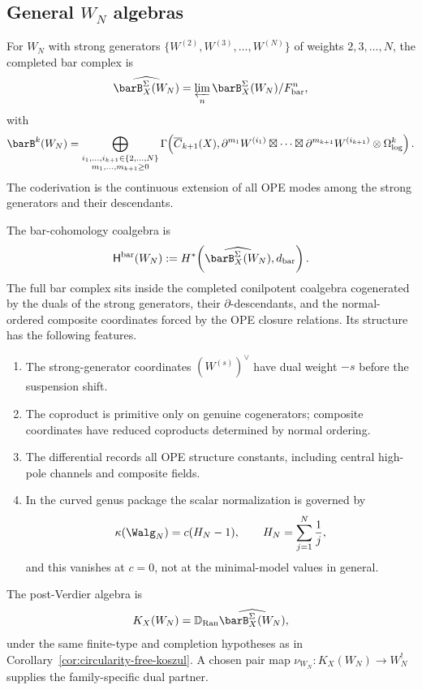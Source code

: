 
\subsection{\texorpdfstring{General $W_N$ algebras}{General W-N algebras}}

\begin{construction}
\label{const:wn-general}

For $W_N$ with strong generators
$\{W^{(2)},W^{(3)},\ldots,W^{(N)}\}$ of weights
$2,3,\ldots,N$, the completed bar complex is
\[
\widehat{\barB_X^\Sigma(W_N)}
=\varprojlim_n \barB_X^\Sigma(W_N)/F^n_{\mathrm{bar}},
\]
with
\[
\barB^k(W_N)=
\bigoplus_{\substack{i_1,\ldots,i_{k+1}\in\{2,\ldots,N\}\\
m_1,\ldots,m_{k+1}\ge0}}
\Gamma\!\left(
\overline C_{k+1}(X),
\partial^{m_1}W^{(i_1)}\boxtimes\cdots\boxtimes
\partial^{m_{k+1}}W^{(i_{k+1})}\otimes\Omega^k_{\log}
\right).
\]
The coderivation is the continuous extension of all OPE modes among the
strong generators and their descendants.

The bar-cohomology coalgebra is
\[
\mathsf H^{\mathrm{bar}}(W_N)
:=H^*\!\left(\widehat{\barB_X^\Sigma(W_N)},d_{\mathrm{bar}}\right).
\]
The full bar complex sits inside the completed conilpotent coalgebra
cogenerated by the duals of the strong generators, their
$\partial$-descendants, and the normal-ordered composite coordinates
forced by the OPE closure relations. Its structure
has the following features.
\begin{enumerate}
\item The strong-generator coordinates $(W^{(s)})^\vee$ have dual
 weight $-s$ before the suspension shift.
\item The coproduct is primitive only on genuine cogenerators; composite
 coordinates have reduced coproducts determined by normal ordering.
\item The differential records all OPE structure constants, including
 central high-pole channels and composite fields.
\item In the curved genus package the scalar normalization is governed
 by
 \[
 \kappa(\Walg_N)=c(H_N-1),\qquad
 H_N=\sum_{j=1}^{N}\frac1j,
 \]
 and this vanishes at $c=0$, not at the minimal-model values in
 general.
\end{enumerate}
The post-Verdier algebra is
\[
K_X(W_N)=\mathbb D_{\operatorname{Ran}}
\widehat{\barB_X^\Sigma(W_N)},
\]
under the same finite-type and completion hypotheses as in
Corollary~\ref{cor:circularity-free-koszul}.  A chosen pair map
$\nu_{W_N}\colon K_X(W_N)\to W_N^!$ supplies the family-specific
dual partner.
\end{construction}

